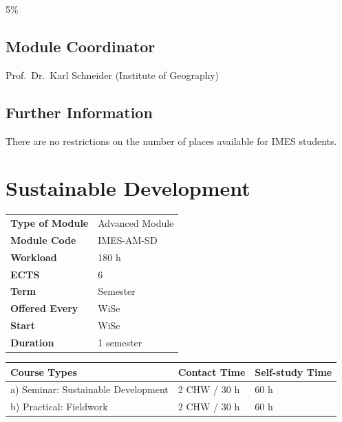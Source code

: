 \documentclass[
  letterpaper,
  10pt,
  openany]{book}
\begin{document}

5\%

\section*{Module Coordinator}\label{module-coordinator}


Prof.~Dr.~Karl Schneider (Institute of Geography)

\section*{Further Information}\label{further-information}


There are no restrictions on the number of places available for IMES
students.

\chapter*{Sustainable Development}\label{sustainable-development}


\begin{longtable}[]{@{}ll@{}}
\toprule\noalign{}
\endhead
\bottomrule\noalign{}
\endlastfoot
\textbf{Type of Module} & Advanced Module \\
\textbf{Module Code} & IMES-AM-SD \\
\textbf{Workload} & 180 h \\
\textbf{ECTS} & 6 \\
\textbf{Term} & Semester \\
\textbf{Offered Every} & WiSe \\
\textbf{Start} & WiSe \\
\textbf{Duration} & 1 semester \\
\end{longtable}

\begin{longtable}[]{@{}lll@{}}
\toprule\noalign{}
Course Types & Contact Time & Self-study Time \\
\midrule\noalign{}
\endhead
\bottomrule\noalign{}
\endlastfoot
a) Seminar: Sustainable Development & 2 CHW / 30 h & 60 h \\
b) Practical: Fieldwork & 2 CHW / 30 h & 60 h \\
\end{longtable}
\end{document}
